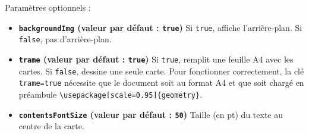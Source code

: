 \documentclass[a4paper, 12pt]{article}
\newcommand{\key}[3]{\textbf{\texttt{#1} (valeur par défaut : \texttt{#2})} #3}
\newcommand{\commande}[1]{\texttt{\textbackslash#1}}
\begin{document}
Paramètres optionnels :
\begin{itemize}
	\item \key{backgroundImg}{true}{Si \texttt{true}, affiche l'arrière-plan. Si \texttt{false}, pas d'arrière-plan.}
	\item \key{trame}{true}{Si \texttt{true}, remplit une feuille A4 avec les cartes. Si \texttt{false}, dessine une seule carte. Pour fonctionner correctement, la clé \texttt{trame=true} nécessite que le document soit au format A4 et que soit chargé en préambule \commande{usepackage[scale=0.95]\{geometry\}}}.
	\item \key{contentsFontSize}{50}{Taille (en pt) du texte au centre de la carte.}
\end{itemize}
\end{document}
